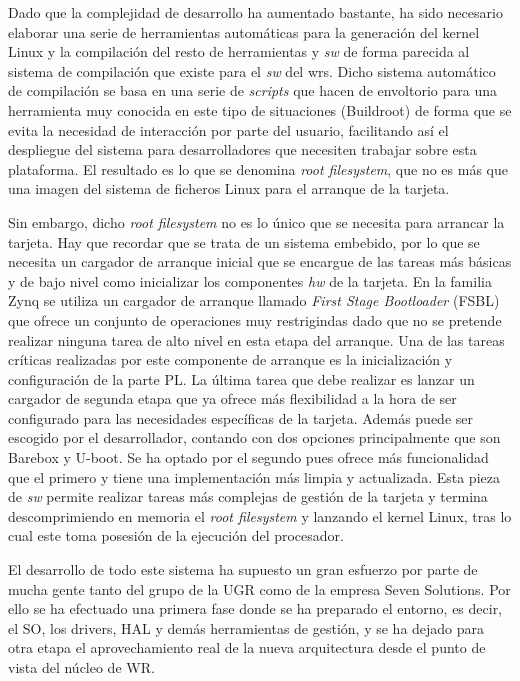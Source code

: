 Dado que la complejidad de desarrollo ha aumentado bastante, ha sido necesario 
elaborar una serie de herramientas automáticas para la generación del kernel 
Linux y la compilación del resto de herramientas y \textit{sw} de forma 
parecida al sistema de compilación que existe para el \textit{sw} del 
\gls{wrs}. Dicho sistema automático de compilación se basa en una serie de 
\textit{scripts} que hacen de envoltorio para una herramienta muy conocida en 
este tipo de situaciones (Buildroot) de forma que se evita la necesidad de 
interacción por parte del usuario, facilitando así el despliegue del sistema 
para desarrolladores que necesiten trabajar sobre esta plataforma. El resultado 
es lo que se denomina \textit{root filesystem}, que no es más que una imagen 
del sistema de ficheros Linux para el arranque de la tarjeta.



Sin embargo, dicho \textit{root filesystem} no es lo único que se necesita para 
arrancar la tarjeta. Hay que recordar que se trata de un sistema embebido, por 
lo que se necesita un cargador de arranque inicial que se encargue de las 
tareas más básicas y de bajo nivel como inicializar los componentes \textit{hw} 
de la tarjeta. En la familia Zynq se utiliza un cargador de arranque llamado 
\textit{First Stage Bootloader} (FSBL) que ofrece un conjunto de operaciones 
muy restrigindas dado que no se pretende realizar ninguna tarea de alto nivel 
en esta etapa del arranque. Una de las tareas críticas realizadas por este 
componente de arranque es la inicialización y configuración de la parte PL. La 
última tarea que debe realizar es lanzar un cargador de segunda etapa que ya 
ofrece más flexibilidad a la hora de ser configurado para las necesidades 
específicas de la tarjeta. Además puede ser escogido por el desarrollador, 
contando con dos opciones principalmente que son Barebox y U-boot. Se ha optado 
por el segundo pues ofrece más funcionalidad que el primero y tiene una 
implementación más limpia y actualizada. Esta pieza de \textit{sw} permite 
realizar tareas más complejas de gestión de la tarjeta y termina 
descomprimiendo en memoria el \textit{root filesystem} y lanzando el kernel 
Linux, tras lo cual este toma posesión de la ejecución del procesador.

El desarrollo de todo este sistema ha supuesto un gran esfuerzo por parte de 
mucha gente tanto del grupo de la UGR como de la empresa Seven Solutions. Por 
ello se ha efectuado una primera fase donde se ha preparado el entorno, es 
decir, el SO, los drivers, HAL y demás herramientas de gestión, y se ha dejado 
para otra etapa el aprovechamiento real de la nueva arquitectura desde el punto 
de vista del núcleo de WR.

